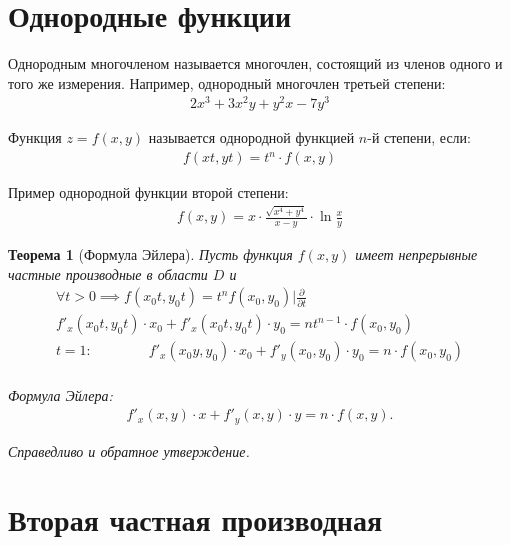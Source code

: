 \documentclass[a4paper,12pt,oneside]{extbook}
\theoremstyle{numbered}
\theoremstyle{unnumbered}
\theoremstyle{named}
\newtheorem{theorem}{Теорема}[section]
\theoremstyle{unnumbered}
\theoremstyle{named}
\theoremstyle{named}
\theoremstyle{named}
\begin{document}
\section{Однородные функции}%
\label{sec:Однородные функции}

\begin{siderules}
    Однородным многочленом называется многочлен, состоящий из членов одного и того же измерения. Например, однородный многочлен третьей степени:
    \begin{gather*}
        2x^3 + 3x^2y + y^2x - 7y^3
    \end{gather*}
\end{siderules}

\begin{siderules}
    Функция \(z = f(x, y)\) называется однородной функцией \(n\)-й степени, если:
    \begin{gather*}
        f(xt, yt) = t^n \cdot f(x, y)
    \end{gather*}

    Пример однородной функции второй степени:
    \begin{gather*}
        f(x, y) = x \cdot \frac{\sqrt{x^4 + y^4}}{x - y} \cdot \ln{\frac{x}{y}}
    \end{gather*}
\end{siderules}

\begin{theorem}[Формула Эйлера]
    Пусть функция \(f(x, y)\) имеет непрерывные частные производные в области \(D\) и
    \begin{gather*}
        \forall t > 0 \implies f(x_0t, y_0t) = t^n f(x_0, y_0) \Big| \frac{\partial}{\partial t} \\
        f'_x(x_0t, y_0t) \cdot x_0 + f'_x(x_0t, y_0t) \cdot y_0 = n t^{n - 1} \cdot f(x_0, y_0) \\
        t = 1: \qquad \qquad f'_x(x_0y, y_0) \cdot x_0 + f'_y(x_0, y_0) \cdot y_0 = n \cdot f(x_0, y_0) \\
    \end{gather*}

    Формула Эйлера:
    \begin{gather*}
        f'_x(x, y) \cdot x + f'_y(x, y) \cdot y = n \cdot f(x, y).
    \end{gather*}

    Справедливо и обратное утверждение.
\end{theorem}

\section{Вторая частная производная}%
\label{sec:Вторая частная производная}
\end{document}
